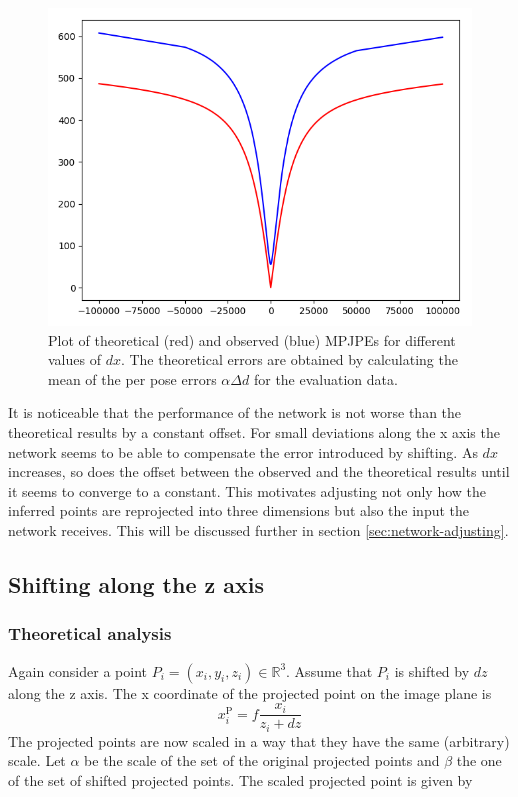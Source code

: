 \documentclass[11pt]{article}
\begin{document}
		\begin{figure}[ht]
			\centering
			\includegraphics[scale=0.5]{images/x_shift_error.png}
			\caption{Plot of theoretical (red) and observed (blue) MPJPEs for different values of $dx$. 
				The theoretical errors are obtained by calculating the mean of the per pose errors $\alpha \Delta d$ for the evaluation data.}
			\label{fig:x-shift-error}
		\end{figure}
	
		It is noticeable that the performance of the network is not worse than the theoretical results by a constant offset.
		For small deviations along the x axis the network seems to be able to compensate the error introduced by shifting.
		As $dx$ increases, so does the offset between the observed and the theoretical results until it seems to converge to a constant.
		This motivates adjusting not only how the inferred points are reprojected into three dimensions but also the input the network receives.
		This will be discussed further in section \ref{sec:network-adjusting}.
		
	\subsection{Shifting along the z axis}
	\label{sec:z-shift-error}
	\subsubsection{Theoretical analysis}
	Again consider a point $P_i=(x_i, y_i, z_i) \in \mathbb{R}^3$. Assume that $P_i$ is shifted by $dz$ along the z axis.
	The x coordinate of the projected point on the image plane is
	\begin{equation}
		x_i^\mathrm{P} = f \frac{x_i}{z_i + dz}
	\end{equation}
	The projected points are now scaled in a way that they have the same (arbitrary) scale.  Let $\alpha$ be the scale of the set of the original projected points and $\beta$ the one of the set of shifted projected points. The scaled projected point is given by
	
\end{document}
